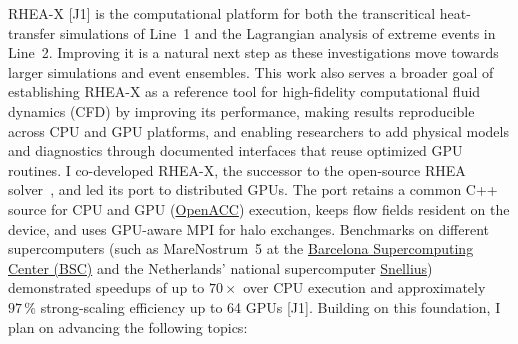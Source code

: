\documentclass[11pt]{article}
\begin{document}
RHEA-X [J1] is the computational platform for both the transcritical heat-transfer simulations of Line~1 and the Lagrangian analysis of extreme events in Line~2. Improving it is a natural next step as these investigations move towards larger simulations and event ensembles. 
This work also serves a broader goal of establishing RHEA-X as a reference tool for high-fidelity computational fluid dynamics (CFD) by improving its performance, making results reproducible across CPU and GPU platforms, and enabling researchers to add physical models and diagnostics through documented interfaces that reuse optimized GPU routines.
I co-developed RHEA-X, the successor to the open-source RHEA solver~\cite{RHEASoftware}, and led its port to distributed GPUs. The port retains a common C++ source for CPU and GPU (\href{https://www.openacc.org/}{OpenACC}) execution, keeps flow fields resident on the device, and uses GPU-aware MPI for halo exchanges. 
Benchmarks on different supercomputers (such as MareNostrum~5 at the \href{https://www.bsc.es/}{Barcelona Supercomputing Center (BSC)} and the Netherlands' national supercomputer \href{https://www.surf.nl/en/services/compute/snellius-the-national-supercomputer}{Snellius}) demonstrated speedups of up to $70\times$ over CPU execution and approximately $97\,\%$ strong-scaling efficiency up to 64 GPUs [J1]. 
Building on this foundation, I plan on advancing the following topics:
\end{document}
